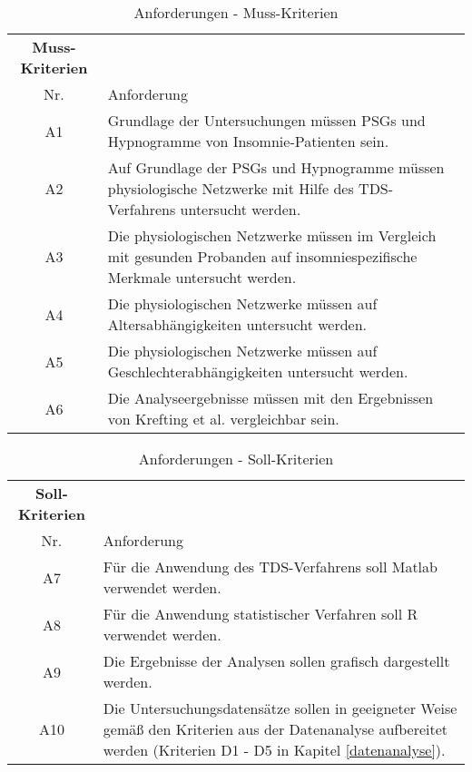 \begin{table}[H] 
\begin{tabularx}{\textwidth}{cllX}
\toprule
\multicolumn{3}{c}{\textbf{Muss-Kriterien}} & \\  
\cmidrule{1-3}
\multicolumn{3}{c}{Nr.} & Anforderung\\ 
\midrule 
\multicolumn{3}{c}{A1} &  Grundlage der Untersuchungen müssen \acs{PSG}s und Hypnogramme von Insomnie-Patienten sein.\\
\multicolumn{3}{c}{A2} & Auf Grundlage der \acs{PSG}s und Hypnogramme müssen physiologische Netzwerke mit Hilfe des \acs{TDS}-Verfahrens untersucht werden.\\
\multicolumn{3}{c}{A3} & Die physiologischen Netzwerke müssen im Vergleich mit gesunden Probanden auf insomniespezifische Merkmale untersucht werden.\\ 
\multicolumn{3}{c}{A4} & Die physiologischen Netzwerke müssen auf Altersabhängigkeiten untersucht werden.\\ 
\multicolumn{3}{c}{A5} & Die physiologischen Netzwerke müssen auf Geschlechterabhängigkeiten untersucht werden.\\
\multicolumn{3}{c}{A6} & Die Analyseergebnisse müssen mit den Ergebnissen von Krefting et al. \parencite{krefting_age_2017} vergleichbar sein.\\
\bottomrule
\end{tabularx}
\caption{Anforderungen - Muss-Kriterien}
\label{tab:Muss-Kriterien}
\end{table}


\begin{table}[H] 
\begin{tabularx}{\textwidth}{cllX}
\toprule
\multicolumn{3}{c}{\textbf{Soll-Kriterien}} & \\  
\cmidrule{1-3}
\multicolumn{3}{c}{Nr.} & Anforderung\\ 
\midrule 
\multicolumn{3}{c}{A7} &  Für die Anwendung des \acs{TDS}-Verfahrens soll Matlab verwendet werden.\\
\multicolumn{3}{c}{A8} & Für die Anwendung statistischer Verfahren soll R verwendet werden.\\
\multicolumn{3}{c}{A9} & Die Ergebnisse der Analysen sollen grafisch dargestellt werden.\\ 
\multicolumn{3}{c}{A10} & Die Untersuchungsdatensätze sollen in geeigneter Weise gemäß den Kriterien aus der Datenanalyse aufbereitet werden (Kriterien D1 - D5 in Kapitel \ref{datenanalyse}).\\
\bottomrule
\end{tabularx}
\caption{Anforderungen - Soll-Kriterien}
\label{tab:Soll-Kriterien}
\end{table}


